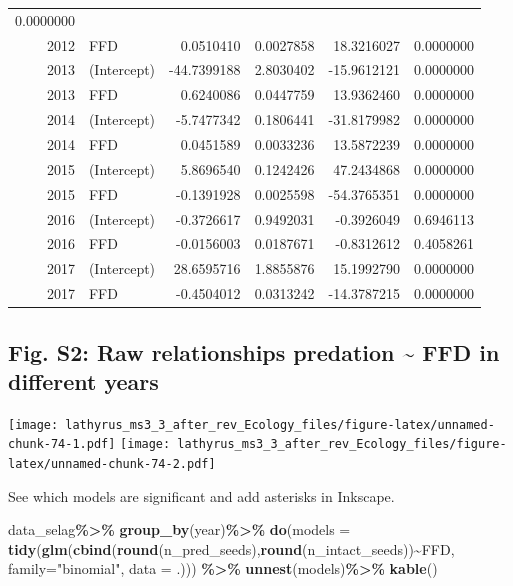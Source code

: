 \documentclass[
]{article}
\newenvironment{Shaded}{\begin{snugshade}}{\end{snugshade}}
\newcommand{\DataTypeTok}[1]{\textcolor[rgb]{0.13,0.29,0.53}{#1}}
\newcommand{\KeywordTok}[1]{\textcolor[rgb]{0.13,0.29,0.53}{\textbf{#1}}}
\newcommand{\NormalTok}[1]{#1}
\newcommand{\OperatorTok}[1]{\textcolor[rgb]{0.81,0.36,0.00}{\textbf{#1}}}
\newcommand{\StringTok}[1]{\textcolor[rgb]{0.31,0.60,0.02}{#1}}
\begin{document}
\begin{longtable}[]{@{}rlrrrr@{}}
0.0000000\tabularnewline
2012 & FFD & 0.0510410 & 0.0027858 & 18.3216027 &
0.0000000\tabularnewline
2013 & (Intercept) & -44.7399188 & 2.8030402 & -15.9612121 &
0.0000000\tabularnewline
2013 & FFD & 0.6240086 & 0.0447759 & 13.9362460 &
0.0000000\tabularnewline
2014 & (Intercept) & -5.7477342 & 0.1806441 & -31.8179982 &
0.0000000\tabularnewline
2014 & FFD & 0.0451589 & 0.0033236 & 13.5872239 &
0.0000000\tabularnewline
2015 & (Intercept) & 5.8696540 & 0.1242426 & 47.2434868 &
0.0000000\tabularnewline
2015 & FFD & -0.1391928 & 0.0025598 & -54.3765351 &
0.0000000\tabularnewline
2016 & (Intercept) & -0.3726617 & 0.9492031 & -0.3926049 &
0.6946113\tabularnewline
2016 & FFD & -0.0156003 & 0.0187671 & -0.8312612 &
0.4058261\tabularnewline
2017 & (Intercept) & 28.6595716 & 1.8855876 & 15.1992790 &
0.0000000\tabularnewline
2017 & FFD & -0.4504012 & 0.0313242 & -14.3787215 &
0.0000000\tabularnewline
\bottomrule
\end{longtable}

\hypertarget{fig.-s2-raw-relationships-predation-ffd-in-different-years}{%
\subsection{Fig. S2: Raw relationships predation \textasciitilde{} FFD
in different
years}\label{fig.-s2-raw-relationships-predation-ffd-in-different-years}}

\texttt{[image: lathyrus\_ms3\_3\_after\_rev\_Ecology\_files/figure-latex/unnamed-chunk-74-1.pdf]}
\texttt{[image: lathyrus\_ms3\_3\_after\_rev\_Ecology\_files/figure-latex/unnamed-chunk-74-2.pdf]}

See which models are significant and add asterisks in Inkscape.

\begin{Shaded}
\begin{Highlighting}[]
\NormalTok{data\_selag}\OperatorTok{\%\textgreater{}\%}
\StringTok{  }\KeywordTok{group\_by}\NormalTok{(year)}\OperatorTok{\%\textgreater{}\%}
\StringTok{  }\KeywordTok{do}\NormalTok{(}\DataTypeTok{models =} \KeywordTok{tidy}\NormalTok{(}\KeywordTok{glm}\NormalTok{(}\KeywordTok{cbind}\NormalTok{(}\KeywordTok{round}\NormalTok{(n\_pred\_seeds),}\KeywordTok{round}\NormalTok{(n\_intact\_seeds))}\OperatorTok{\textasciitilde{}}\NormalTok{FFD,}
                       \DataTypeTok{family=}\StringTok{"binomial"}\NormalTok{, }\DataTypeTok{data =}\NormalTok{ .))) }\OperatorTok{\%\textgreater{}\%}\StringTok{ }
\StringTok{  }\KeywordTok{unnest}\NormalTok{(models)}\OperatorTok{\%\textgreater{}\%}
\StringTok{  }\KeywordTok{kable}\NormalTok{()}
\end{Highlighting}
\end{Shaded}
\end{document}
